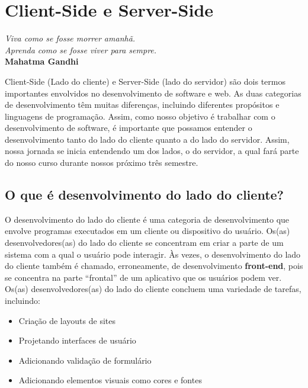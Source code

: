 \chapter{Client-Side e Server-Side}\label{cap:cap_02}

\begin{flushright}
	\textit{
		Viva como se fosse morrer amanhã. \\ Aprenda como se fosse viver para sempre.
	} \\
	\textbf{Mahatma Gandhi}
\end{flushright}

Client-Side (Lado do cliente) e Server-Side (lado do servidor) são dois termos importantes envolvidos no desenvolvimento de software e web. As duas categorias de desenvolvimento têm muitas diferenças, incluindo diferentes propósitos e linguagens de programação. Assim, como nosso objetivo é trabalhar com o desenvolvimento de software, é importante que possamos  entender o desenvolvimento tanto do lado do cliente quanto a do lado do servidor. Assim, nossa jornada se inicia entendendo um dos lados, o do servidor, a qual fará parte do nosso curso durante nossos próximo três semestre. 

\section{O que é desenvolvimento do lado do cliente?}

O desenvolvimento do lado do cliente é uma categoria de desenvolvimento que envolve programas executados em um cliente ou dispositivo do usuário. Os(as) desenvolvedores(as) do lado do cliente se concentram em criar a parte de um sistema com a qual o usuário pode interagir. Às vezes, o desenvolvimento do lado do cliente também é chamado, erroneamente, de desenvolvimento \textbf{front-end}, pois se concentra na parte ``frontal'' de um aplicativo que os usuários podem ver. Os(as) desenvolvedores(as) do lado do cliente concluem uma variedade de tarefas, incluindo:

\begin{itemize}[leftmargin=1.7cm]
	\setlength\itemsep{0em}
	\item Criação de layouts de sites
	\item Projetando interfaces de usuário
	\item Adicionando validação de formulário
	\item Adicionando elementos visuais como cores e fontes
\end{itemize}

